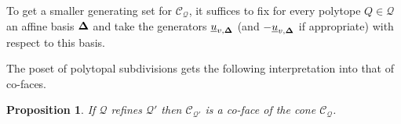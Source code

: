 \documentclass[12pt, a4article]{amsart}   	%
\numberwithin{equation}{section}
\theoremstyle{plain}
\newtheorem{proposition}[theorem]{Proposition}
\theoremstyle{definition}
\newcommand{\bfDelta}{{\bf \Delta}}
\newcommand{\mcC}{{\mathcal C}}
\newcommand{\mcQ}{{\mathcal Q}}
\newcommand{\uu}{{\underline u}}
\begin{document}
To get a smaller generating set for $\mcC_\mcQ$, it suffices to fix for every 
polytope $Q\in\mathcal Q$ an affine basis $\bfDelta$ and take the generators
$\uu_{v,\bfDelta}$ (and $-\uu_{v,\bfDelta}$ if appropriate) with respect to this basis.

The poset of polytopal subdivisions gets the following interpretation into that of co-faces.

\begin{proposition}\label{prp:refined:coface}
If $\mcQ$ refines $\mcQ'$ then $\mcC_{\mcQ'}$ is a co-face of the cone $\mcC_\mcQ$.
\end{proposition}

\end{document}

